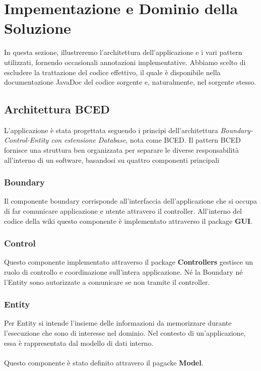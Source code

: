 \documentclass{article}
\begin{document}
		\newpage
		
		\section{Impementazione e Dominio della Soluzione}
		
		In questa sezione, illustreremo l'architettura dell'applicazione e i vari pattern utilizzati, fornendo occasionali annotazioni implementative. Abbiamo scelto di escludere la trattazione del codice effettivo, il quale è disponibile nella documentazione JavaDoc del codice sorgente e, naturalmente, nel sorgente stesso.
		
		\subsection{Architettura BCED}
		
		L'applicazione è stata progettata seguendo i principi dell'architettura {\itshape {Boundary-Control-Entity con estensione Database}}, nota come BCED. Il pattern BCED fornisce una struttura ben organizzata per separare le diverse responsabilità all'interno di un software, basandosi su quattro componenti principali
		
		
		\subsubsection{Boundary}
		Il componente boundary corrisponde all'interfaccia dell'applicazione che si occupa di far comunicare applicazione e utente attravero il controller. All'interno del codice della wiki questo componente \`e implementato attraverso il package \textbf{GUI}.

		\subsubsection{Control} Questo componente implementato attraverso il package \textbf{Controllers} gestisce un ruolo di controllo  e coordinazione sull'intera applicazione. Né la Boundary né l'Entity sono autorizzate a comunicare se non tramite il controller.
		
		\subsubsection{Entity}
		Per Entity si intende l'insieme delle informazioni da memorizzare durante l'esecuzione che sono di interesse nel dominio. Nel contesto di un'applicazione, essa è rappresentata dal modello di dati interno. \\\\
		Questo componente \`e stato definito attravero il pagacke \textbf{Model}.
		
\end{document}
